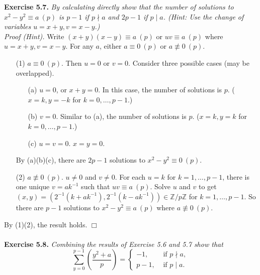 \documentclass{article}
\begin{document}
\textbf{Exercise 5.7.}
\emph{By calculating directly show that
the number of solutions to $x^2 - y^2 \equiv a \: (p)$
is $p-1$ if $p \nmid a$ and $2p-1$ if $p \mid a$.
(Hint: Use the change of variables $u=x+y, v=x-y$.) } \\

\emph{Proof (Hint).}
Write $(x+y)(x-y) \equiv a \: (p)$ or $uv \equiv a \: (p)$ where $u=x+y, v=x-y$.
For any $a$, either $a \equiv 0 \: (p)$ or $a \not\equiv 0 \: (p)$.
\begin{enumerate}
\item[(1)]
$a \equiv 0 \: (p)$. Then $u = 0$ or $v = 0$.
Consider three possible cases (may be overlapped).
  \begin{enumerate}
  \item[(a)]
  $u = 0$, or $x+y = 0$. In this case, the number of solutions is $p$.
  ($x = k, y = -k$ for $k = 0, \ldots, p-1$.)
  \item[(b)]
  $v = 0$. Similar to (a), the number of solutions is $p$.
  ($x = k, y = k$ for $k = 0, \ldots, p-1$.)
  \item[(c)]
  $u = v = 0$. $x = y = 0$.
  \end{enumerate}
  By (a)(b)(c), there are $2p-1$ solutions to $x^2 - y^2 \equiv 0 \: (p)$.
\item[(2)]
$a \not\equiv 0 \: (p)$. $u \neq 0$ and $v \neq 0$.
For each $u = k$ for $k = 1, \ldots, p-1$, there is one unique $v = a k^{-1}$
such that $uv \equiv a \: (p)$. Solve $u$ and $v$ to get
$(x, y) = (2^{-1} (k + a k^{-1}), 2^{-1} (k - a k^{-1})) \in \mathbb{Z}/p\mathbb{Z}$
for $k = 1, \ldots, p-1$.
So there are $p-1$ solutions to $x^2 - y^2 \equiv a \: (p)$ where $a \not\equiv 0 \: (p)$.
\end{enumerate}
By (1)(2), the result holds.
$\Box$ \\\\






\textbf{Exercise 5.8.}
\emph{Combining the results of Exercise 5.6 and 5.7 show that
\begin{equation*}
  \sum_{y=0}^{p-1} \left( \frac{y^2 + a}{p} \right) =
    \begin{cases}
      -1,  & \text{ if $p \nmid a$}, \\
      p-1, & \text{ if $p \mid a$}.
    \end{cases}
\end{equation*}} \\
\end{document}
